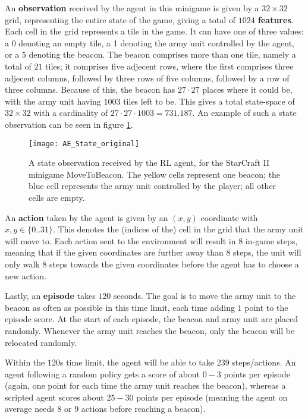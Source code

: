 An \textbf{observation} received by the agent in this minigame is given by a $32 \times 32$ grid, representing the entire state of the game,  giving a total of \textbf{$1024$ features}. Each cell in the grid represents a tile in the game. It can have one of three values: a 0 denoting an empty tile, a 1 denoting the army unit controlled by the agent, or a 5 denoting the beacon. The beacon comprises more than one tile, namely a total of $21$ tiles; it comprises five adjecent rows, where the first comprises three adjecent columns, followed by three rows of five columns, followed by a row of three columns. Because of this, the beacon has $27 \cdot 27$ places where it could be, with the army unit having $1003$ tiles left to be. This gives  a total state-space of $32 \times 32$ with a cardinality of $27 \cdot 27 \cdot 1003 = 731.187$. An example of such a state observation can be seen in figure \ref{fig:state_example}.

\begin{figure}[h]
    \centering
    \texttt{[image: AE\_State\_original]}
    \caption{A state observation received by the RL agent, for the StarCraft II minigame MoveToBeacon. The yellow cells represent one beacon; the blue cell represents the army unit controlled by the player; all other cells are empty.}
    \label{fig:state_example}
\end{figure}

An \textbf{action} taken by the agent is given by an $(x,y)$ coordinate with $x,y \in \{0 .. 31\}$. This denotes the (indices of the) cell in the grid that the army unit will move to. Each action sent to the environment will result in $8$ in-game steps, meaning that if the given coordinates are further away than 8 steps, the unit will only walk 8 steps towards the given coordinates before the agent has to choose a new action.

Lastly, an \textbf{episode} takes $120$ seconds. The goal is to move the army unit to the beacon as often as possible in this time limit, each time adding $1$ point to the episode score. At the start of each episode, the beacon and army unit are placed randomly. Whenever the army unit reaches the beacon, only the beacon will be relocated randomly. 

Within the $120$s time limit, the agent will be able to take 239 steps/actions. An agent following a random policy gets a score of about $0-3$ points per episode (again, one point for each time the army unit reaches the beacon), whereas a scripted agent scores about $25-30$ points per episode (meaning the agent on average needs $8$ or $9$ actions before reaching a beacon).

